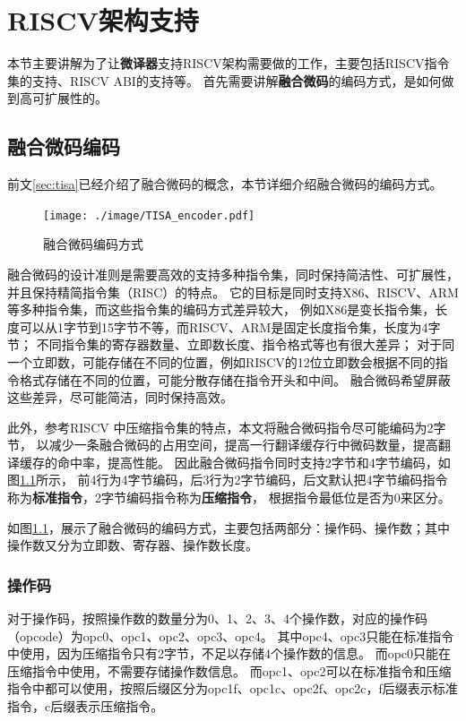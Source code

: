 \chapter{RISCV架构支持}\label{chap:RISCV}

本节主要讲解为了让\textbf{微译器}支持RISCV架构需要做的工作，主要包括RISCV指令集的支持、RISCV ABI的支持等。
首先需要讲解\textbf{融合微码}的编码方式，是如何做到高可扩展性的。

\section{融合微码编码}

前文\ref{sec:tisa}已经介绍了融合微码的概念，本节详细介绍融合微码的编码方式。

\begin{figure}[!htbp]
  \centering
  \texttt{[image: ./image/TISA\_encoder.pdf]}
  \caption{融合微码编码方式}
  \label{img:TISA_encoder}
\end{figure}

融合微码的设计准则是需要高效的支持多种指令集，同时保持简洁性、可扩展性，并且保持精简指令集（RISC）的特点。
它的目标是同时支持X86、RISCV、ARM等多种指令集，而这些指令集的编码方式差异较大，
例如X86是变长指令集，长度可以从1字节到15字节不等，而RISCV、ARM是固定长度指令集，长度为4字节；
不同指令集的寄存器数量、立即数长度、指令格式等也有很大差异；
对于同一个立即数，可能存储在不同的位置，例如RISCV的12位立即数会根据不同的指令格式存储在不同的位置，可能分散存储在指令开头和中间。
融合微码希望屏蔽这些差异，尽可能简洁，同时保持高效。

此外，参考RISCV 中压缩指令集的特点，本文将融合微码指令尽可能编码为2字节，
以减少一条融合微码的占用空间，提高一行翻译缓存行中微码数量，提高翻译缓存的命中率，提高性能。
因此融合微码指令同时支持2字节和4字节编码，如图\ref{img:TISA_encoder}所示，
前4行为4字节编码，后3行为2字节编码，后文默认把4字节编码指令称为\textbf{标准指令}，2字节编码指令称为\textbf{压缩指令}，
根据指令最低位是否为0来区分。

如图\ref{img:TISA_encoder}，展示了融合微码的编码方式，主要包括两部分：操作码、操作数；其中操作数又分为立即数、寄存器、操作数长度。



\subsection{操作码}
对于操作码，按照操作数的数量分为0、1、2、3、4个操作数，对应的操作码（opcode）为opc0、opc1、opc2、opc3、opc4。
其中opc4、opc3只能在标准指令中使用，因为压缩指令只有2字节，不足以存储4个操作数的信息。
而opc0只能在压缩指令中使用，不需要存储操作数信息。
而opc1、opc2可以在标准指令和压缩指令中都可以使用，按照后缀区分为opc1f、opc1c、opc2f、opc2c，f后缀表示标准指令，c后缀表示压缩指令。


